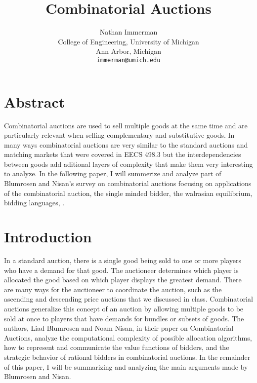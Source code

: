 \documentclass[10pt,onecolumn,letterpaper]{article}
\theoremstyle{definition}
\begin{document}
\title{Combinatorial Auctions}

\author{Nathan Immerman\\
College of Engineering, University of Michigan\\
Ann Arbor, Michigan\\
{\tt\small immerman@umich.edu}
}

\maketitle


\section{Abstract}
Combinatorial auctions are used to sell multiple goods at the same time and are particularly relevant when selling complementary and substitutive goods. In many ways combinatorial auctions are very similar to the standard auctions and matching markets that were covered in EECS 498.3 but the interdependencies between goods add aditional layers of complexity that make them very interesting to analyze. In the following paper, I will summerize and analyze part of Blumrosen and Nisan's survey on combinatorial auctions focusing on applications of the combinatorial auction, the single minded bidder, the walrasian equilibrium, bidding languages, \cite{paper}.

\section{Introduction} %

In a standard auction,  there is a single good being sold to one or more players who have a demand for that good. The auctioneer determines which player is allocated the good based on which player displays the greatest demand. There are many ways for the auctioneer to coordinate the auction, such as the ascending and descending price auctions that we discussed in class. Combinatorial auctions generalize this concept of an auction by allowing multiple goods to be sold at once to players that have demands for bundles or subsets of goods. The authors, Liad Blumrosen and Noam Nisan, in their paper on Combinatorial Auctions, analyze the computational complexity of possible allocation algorithms, how to represent and communicate the value functions of bidders, and the strategic behavior of rational bidders in combinatorial auctions. In the remainder of this paper, I will be summarizing and analyzing the main arguments made by Blumrosen and Nisan.
\end{document}
